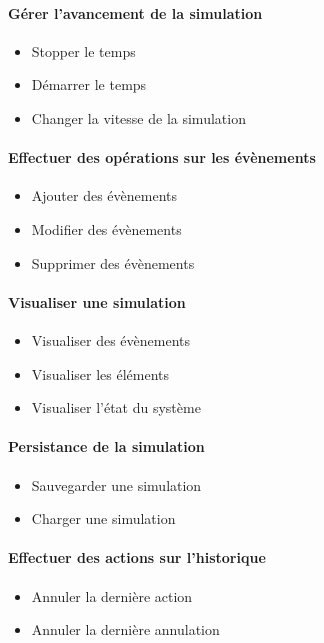 {\paragraph{Gérer l'avancement de la simulation}
\begin{itemize}
	\item Stopper le temps
	\item Démarrer le temps
	\item Changer la vitesse de la simulation
\end{itemize}

\paragraph{Effectuer des opérations sur les évènements}
\begin{itemize}
	\item Ajouter des évènements
	\item Modifier des évènements
	\item Supprimer des évènements
\end{itemize}

\paragraph{Visualiser une simulation}
\begin{itemize}
	\item Visualiser des évènements
	\item Visualiser les éléments
	\item Visualiser l'état du système
\end{itemize}

\paragraph{Persistance de la simulation}
\begin{itemize}
	\item Sauvegarder une simulation
	\item Charger une simulation
\end{itemize}

\paragraph{Effectuer des actions sur l'historique}
\begin{itemize}
	\item Annuler la dernière action
	\item Annuler la dernière annulation
\end{itemize}

}
